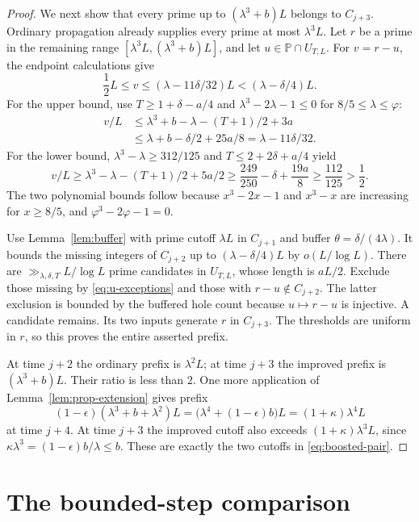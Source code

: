 \documentclass[11pt,letterpaper]{article}
\numberwithin{equation}{section}
\theoremstyle{remark}
\newcommand{\Pp}{\mathbb P}
\newcommand{\ph}{\varphi}
\begin{document}
\begin{proof}
We next show that every prime up to $(\lambda^3+b)L$ belongs to $C_{j+3}$.
Ordinary propagation already supplies every prime at most $\lambda^3L$.
Let $r$ be a prime in the remaining range
$[\lambda^3L,(\lambda^3+b)L]$, and let $u\in\Pp\cap U_{T,L}$.
For $v=r-u$, the endpoint calculations give
\begin{equation}\label{eq:v-boost-range}
 \frac12 L\le v\le(\lambda-11\delta/32)L
                     <(\lambda-\delta/4)L.
\end{equation}
For the upper bound, use $T\ge1+\delta-a/4$ and
$\lambda^3-2\lambda-1\le0$ for $8/5\le\lambda\le\ph$:
\begin{align*}
 v/L
 &\le\lambda^3+b-\lambda-(T+1)/2+3a\\
 &\le\lambda+b-\delta/2+25a/8
 =\lambda-11\delta/32.
\end{align*}
For the lower bound, $\lambda^3-\lambda\ge312/125$ and
$T\le2+2\delta+a/4$ yield
\[
 v/L\ge\lambda^3-\lambda-(T+1)/2+5a/2
 \ge\frac{249}{250}-\delta+\frac{19a}{8}
 \ge\frac{112}{125}>\frac12.
\]
The two polynomial bounds follow because $x^3-2x-1$ and $x^3-x$
are increasing for $x\ge8/5$, and $\ph^3-2\ph-1=0$.

Use Lemma~\ref{lem:buffer} with prime cutoff $\lambda L$ in $C_{j+1}$
and buffer $\theta=\delta/(4\lambda)$. It bounds the missing integers
of $C_{j+2}$ up to $(\lambda-\delta/4)L$ by $o(L/\log L)$.
There are $\gg_{\lambda,\delta,T}L/\log L$ prime candidates in $U_{T,L}$,
whose length is $aL/2$. Exclude those missing by \eqref{eq:u-exceptions}
and those with $r-u\notin C_{j+2}$. The latter exclusion is bounded by
the buffered hole count because $u\mapsto r-u$ is injective.
A candidate remains. Its two inputs generate $r$ in $C_{j+3}$.
The thresholds are uniform in $r$, so this proves the entire asserted prefix.

At time $j+2$ the ordinary prefix is $\lambda^2L$; at time $j+3$ the
improved prefix is $(\lambda^3+b)L$. Their ratio is less than $2$.
One more application of Lemma~\ref{lem:prop-extension} gives prefix
\[
 (1-\epsilon)(\lambda^3+b+\lambda^2)L
   =\bigl(\lambda^4+(1-\epsilon)b\bigr)L
   =(1+\kappa)\lambda^4L
\]
at time $j+4$. At time $j+3$ the improved cutoff also exceeds
$(1+\kappa)\lambda^3L$, since
$\kappa\lambda^3=(1-\epsilon)b/\lambda\le b$.
These are exactly the two cutoffs in \eqref{eq:boosted-pair}.
\end{proof}

\section{The bounded-step comparison}
\end{document}
